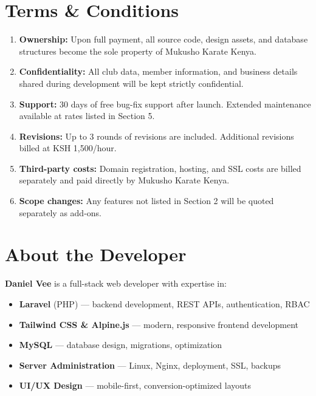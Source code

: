 \documentclass[12pt,a4paper]{article}
\begin{document}
\section{Terms \& Conditions}

\begin{enumerate}[leftmargin=1.5em]
    \item \textbf{Ownership:} Upon full payment, all source code, design assets, and database structures become the sole property of Mukusho Karate Kenya.
    \item \textbf{Confidentiality:} All club data, member information, and business details shared during development will be kept strictly confidential.
    \item \textbf{Support:} 30 days of free bug-fix support after launch. Extended maintenance available at rates listed in Section 5.
    \item \textbf{Revisions:} Up to 3 rounds of revisions are included. Additional revisions billed at KSH 1,500/hour.
    \item \textbf{Third-party costs:} Domain registration, hosting, and SSL costs are billed separately and paid directly by Mukusho Karate Kenya.
    \item \textbf{Scope changes:} Any features not listed in Section 2 will be quoted separately as add-ons.
\end{enumerate}

\section{About the Developer}

\textbf{Daniel Vee} is a full-stack web developer with expertise in:

\begin{itemize}[leftmargin=1.5em]
    \item \textbf{Laravel} (PHP) --- backend development, REST APIs, authentication, RBAC
    \item \textbf{Tailwind CSS \& Alpine.js} --- modern, responsive frontend development
    \item \textbf{MySQL} --- database design, migrations, optimization
    \item \textbf{Server Administration} --- Linux, Nginx, deployment, SSL, backups
    \item \textbf{UI/UX Design} --- mobile-first, conversion-optimized layouts
\end{itemize}
\end{document}
